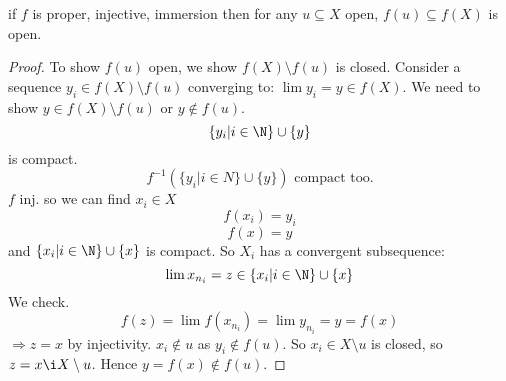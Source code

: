 \begin{proposition}
  if $f$ is proper, injective, immersion then for any $u\subseteq X$ open, $f(u)\subseteq f(X)$ is open.
\end{proposition}
\begin{proof}
  To show $f(u)$ open, we show $f(X)\setminus f(u)$ is closed.
  \newline Consider a sequence $y_i\in f(X)\setminus f(u)$ converging to: $\lim y_i=y\in f(X)$. We need to show $y\in f(X)\setminus f(u)$ or $y\notin f(u)$.
    $$\{y_i |i\in \N\} \cup \{y\}$$
    is compact.
      $$f ^{-1}\left(\{y_i | i\in N\} \cup \{y\}\right) \text{ compact too.}$$
      $f$ inj. so we can find $x_i\in X$
        $$f(x_i)=y_i$$
        $$f(x)=y$$
      and $\{x_i|i\in \N\} \cup \{x\}$ is compact. So $X_i$ has a convergent subsequence:
        $$\lim x_{n_i}=z \in \{x_i|i\in \N\} \cup \{x\}$$
        We check.
        $$f(z)=\lim f(x_{n_i})=\lim y_{n_i}=y=f(x)$$
        $\Rightarrow z=x$ by injectivity. $x_i\notin u$ as $y_i \notin f(u)$. So $x_i\in X\setminus u$ is closed, so $z=x\i X\setminus u$. Hence $y=f(x)\notin f(u)$.
        \qedhere
\end{proof}
